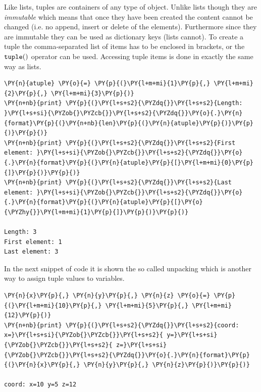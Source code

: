 Like lists, tuples are containers of any type of object. Unlike lists though they are 
\emph{immutable} which means that once they have been created the content cannot be 
changed (i.e. no append, insert or delete of the elements). Furthermore since they are 
immutable they can be used as dictionary keys (lists cannot).
To create a tuple the comma-separated list of items has to be enclosed in brackets, or 
the $\tt{tuple()}$ operator can be used.
Accessing tuple items is done in exactly the same way as lists.

\begin{codebox}
\begin{Verbatim}[commandchars=\\\{\}]
\PY{n}{atuple} \PY{o}{=} \PY{p}{(}\PY{l+m+mi}{1}\PY{p}{,} \PY{l+m+mi}{2}\PY{p}{,} \PY{l+m+mi}{3}\PY{p}{)}
\PY{n+nb}{print} \PY{p}{(}\PY{l+s+s2}{\PYZdq{}}\PY{l+s+s2}{Length: }\PY{l+s+si}{\PYZob{}\PYZcb{}}\PY{l+s+s2}{\PYZdq{}}\PY{o}{.}\PY{n}{format}\PY{p}{(}\PY{n+nb}{len}\PY{p}{(}\PY{n}{atuple}\PY{p}{)}\PY{p}{)}\PY{p}{)}
\PY{n+nb}{print} \PY{p}{(}\PY{l+s+s2}{\PYZdq{}}\PY{l+s+s2}{First element: }\PY{l+s+si}{\PYZob{}\PYZcb{}}\PY{l+s+s2}{\PYZdq{}}\PY{o}{.}\PY{n}{format}\PY{p}{(}\PY{n}{atuple}\PY{p}{[}\PY{l+m+mi}{0}\PY{p}{]}\PY{p}{)}\PY{p}{)}
\PY{n+nb}{print} \PY{p}{(}\PY{l+s+s2}{\PYZdq{}}\PY{l+s+s2}{Last element: }\PY{l+s+si}{\PYZob{}\PYZcb{}}\PY{l+s+s2}{\PYZdq{}}\PY{o}{.}\PY{n}{format}\PY{p}{(}\PY{n}{atuple}\PY{p}{[}\PY{o}{\PYZhy{}}\PY{l+m+mi}{1}\PY{p}{]}\PY{p}{)}\PY{p}{)}

Length: 3
First element: 1
Last element: 3
\end{Verbatim}
\end{codebox}

In the next snippet of code it is shown the so called unpacking which is another way to assign tuple values to variables.

\begin{codebox}
\begin{Verbatim}[commandchars=\\\{\}]
\PY{n}{x}\PY{p}{,} \PY{n}{y}\PY{p}{,} \PY{n}{z} \PY{o}{=} \PY{p}{(}\PY{l+m+mi}{10}\PY{p}{,} \PY{l+m+mi}{5}\PY{p}{,} \PY{l+m+mi}{12}\PY{p}{)}
\PY{n+nb}{print} \PY{p}{(}\PY{l+s+s2}{\PYZdq{}}\PY{l+s+s2}{coord: x=}\PY{l+s+si}{\PYZob{}\PYZcb{}}\PY{l+s+s2}{ y=}\PY{l+s+si}{\PYZob{}\PYZcb{}}\PY{l+s+s2}{ z=}\PY{l+s+si}{\PYZob{}\PYZcb{}}\PY{l+s+s2}{\PYZdq{}}\PY{o}{.}\PY{n}{format}\PY{p}{(}\PY{n}{x}\PY{p}{,} \PY{n}{y}\PY{p}{,} \PY{n}{z}\PY{p}{)}\PY{p}{)}

coord: x=10 y=5 z=12
\end{Verbatim}
\end{codebox}

